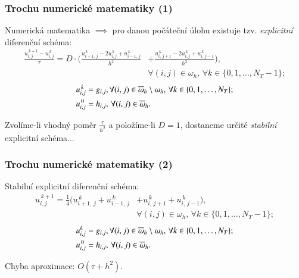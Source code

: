 \begin{frame}\frametitle{Trochu numerické matematiky (1)}
\begin{block}{\centering Numerická matematika $\implies$ pro danou počáteční úlohu existuje tzv. \textit{explicitní} diferenční schéma: }
\begin{equation*}
\begin{split}
	\frac{u^{\,k+1}_{i,j}-u^{\,k}_{i,j}}{\tau}=D\cdot\big(\frac{u^{\,k}_{i+1,\,j}-2u^{\,k}_{i,j}+u^{\,k}_{i-1,\,j}}{h^{2}}&+\frac{u^{\,k}_{i,\,j+1}-2u^{\,k}_{i,j}+u^{\,k}_{i,\,j-1}}{h^{2}}\big),\\
	&\forall(i,j)\in\omega_{h},\,\forall k\in\{0,1,\dots,N_{T}-1\};	
\end{split}
\end{equation*}
\begin{equation*} \label{fin_diff_scheme}
	\begin{split}
		u^{\,k}_{i,j}&=g_{i,j},\forall(i,j)\in\overline{\omega}_{h}\setminus\omega_{h},\,\forall k\in\{0,1,\dots,N_{T}\};\\
		u^{\,0}_{i,j}&=h_{i,j},\,\forall(i,j)\in\overline{\omega}_{h}.
	\end{split}
\end{equation*}
\end{block}
Zvolíme-li vhodný poměr $\frac{\tau}{h^{2}}$ a položíme-li $D=1$, dostaneme určité \textit{stabilní} explicitní schéma...
\end{frame}


\begin{frame}\frametitle{Trochu numerické matematiky (2)}
\begin{block}{Stabilní explicitní diferenční schéma:}
\begin{equation*}\label{final_fin_diff_scheme}
	\begin{split}
		u^{\,k+1}_{i,j}=\frac{1}{4}\big(u^{\,k}_{i+1,\,j}+u^{\,k}_{i-1,\,j}&+u^{\,k}_{i,\,j+1}+u^{\,k}_{i,\,j-1}\big),\\
		&\forall(i,j)\in\omega_{h},\,\forall k\in\{0,1,\dots,N_{T}-1\};
	\end{split}
\end{equation*}
\begin{equation*}
	\begin{split}
		u^{k}_{i,j}&=g_{i,j},\forall(i,j)\in\overline{\omega}_{h}\setminus\omega_{h},\,\forall k\in\{0,1,\dots,N_{T}\};\\
		u^{\,0}_{i,j}&=h_{i,j},\,\forall(i,j)\in\overline{\omega}_{h}.
	\end{split}
\end{equation*}
\end{block}
\begin{alertblock}{Chyba aproximace:}
\centering $O(\tau+h^{2})$.
\end{alertblock}
\end{frame}

